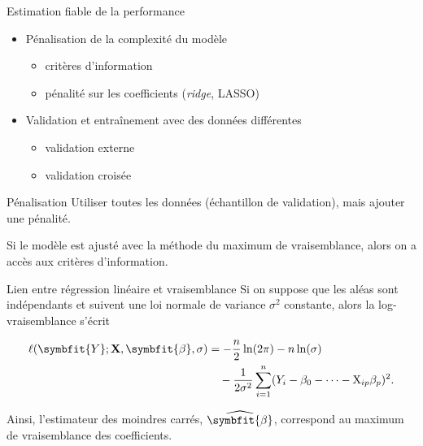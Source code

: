 \documentclass[
  ignorenonframetext,
]{beamer}
\providecommand{\tightlist}{%
  \setlength{\itemsep}{0pt}\setlength{\parskip}{0pt}}\usepackage{longtable,booktabs,array}
\renewcommand{\boldsymbol}[1]{\symbfit{#1}}
\begin{document}
\begin{frame}{Estimation fiable de la performance}
\label{estimation-fiable-de-la-performance}
\begin{itemize}
\tightlist
\item
  Pénalisation de la complexité du modèle

  \begin{itemize}
  \tightlist
  \item
    critères d'information
  \item
    pénalité sur les coefficients (\emph{ridge}, LASSO)
  \end{itemize}
\item
  Validation et entraînement avec des données différentes

  \begin{itemize}
  \tightlist
  \item
    validation externe
  \item
    validation croisée
  \end{itemize}
\end{itemize}
\end{frame}

\begin{frame}{Pénalisation}
\label{puxe9nalisation}
Utiliser toutes les données (échantillon de validation), mais ajouter
une pénalité.

Si le modèle est ajusté avec la méthode du maximum de vraisemblance,
alors on a accès aux critères d'information.
\end{frame}

\begin{frame}{Lien entre régression linéaire et vraisemblance}
\label{lien-entre-ruxe9gression-linuxe9aire-et-vraisemblance}
Si on suppose que les aléas sont indépendants et suivent une loi normale
de variance \(\sigma^2\) constante, alors la log-vraisemblance s'écrit

\begin{align*}
\ell(\boldsymbol{Y}; \mathbf{X}, \boldsymbol{\beta}, \sigma) & = -\frac{n}{2}\ln(2\pi) -n\ln(\sigma) \\&\quad - \frac{1}{2\sigma^2}\sum_{i=1}^n (Y_i - \beta_0 - \cdots - \mathrm{X}_{ip}\beta_p)^2.
\end{align*}

Ainsi, l'estimateur des moindres carrés,
\(\widehat{\boldsymbol{\beta}}\), correspond au maximum de vraisemblance
des coefficients.
\end{frame}
\end{document}
